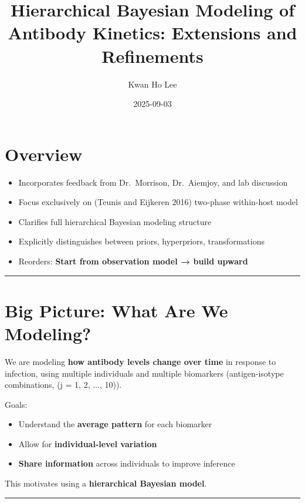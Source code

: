 \documentclass[
]{article}
\title{Hierarchical Bayesian Modeling of Antibody Kinetics: Extensions
and Refinements}
\author{Kwan Ho Lee}
\date{2025-09-03}
\providecommand{\tightlist}{%
  \setlength{\itemsep}{0pt}\setlength{\parskip}{0pt}}\usepackage{longtable,booktabs,array}
\begin{document}
\maketitle


\section{Overview}\label{overview}

\begin{itemize}
\tightlist
\item
  Incorporates feedback from Dr.~Morrison, Dr.~Aiemjoy, and lab
  discussion
\item
  Focus exclusively on (Teunis and Eijkeren 2016) two-phase within-host
  model
\item
  Clarifies full hierarchical Bayesian modeling structure
\item
  Explicitly distinguishes between priors, hyperpriors, transformations
\item
  Reorders: \textbf{Start from observation model → build upward}
\end{itemize}

\begin{center}\rule{0.5\linewidth}{0.5pt}\end{center}

\section{Big Picture: What Are We
Modeling?}\label{big-picture-what-are-we-modeling}

We are modeling \textbf{how antibody levels change over time} in
response to infection, using multiple individuals and multiple
biomarkers (antigen-isotype combinations, (j = 1, 2, \(\dots\), 10)).

Goals:

\begin{itemize}
\tightlist
\item
  Understand the \textbf{average pattern} for each biomarker
\item
  Allow for \textbf{individual-level variation}
\item
  \textbf{Share information} across individuals to improve inference
\end{itemize}

This motivates using a \textbf{hierarchical Bayesian model}.

\begin{center}\rule{0.5\linewidth}{0.5pt}\end{center}
\end{document}
